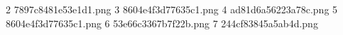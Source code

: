 2 7897c8481e53e1d1.png
3 8604e4f3d77635c1.png
4 ad81d6a56223a78c.png
5 8604e4f3d77635c1.png
6 53e66c3367b7f22b.png
7 244cf83845a5ab4d.png
